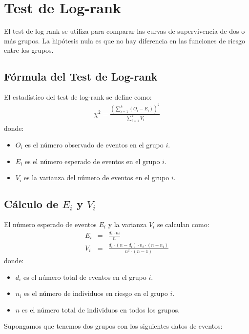 \documentclass[a4paper]{report} %
\begin{document}
\section*{Test de Log-rank}
El test de log-rank se utiliza para comparar las curvas de supervivencia de dos o m\'as grupos. La hip\'otesis nula es que no hay diferencia en las funciones de riesgo entre los grupos.

\subsection*{F\'ormula del Test de Log-rank}
El estad\'istico del test de log-rank se define como:
\begin{eqnarray*}
\chi^2 = \frac{\left(\sum_{i=1}^k (O_i - E_i)\right)^2}{\sum_{i=1}^k V_i}
\end{eqnarray*}
donde:
\begin{itemize}
    \item $O_i$ es el n\'umero observado de eventos en el grupo $i$.
    \item $E_i$ es el n\'umero esperado de eventos en el grupo $i$.
    \item $V_i$ es la varianza del n\'umero de eventos en el grupo $i$.
\end{itemize}

\subsection*{C\'alculo de $E_i$ y $V_i$}
El n\'umero esperado de eventos $E_i$ y la varianza $V_i$ se calculan como:
\begin{eqnarray*}
E_i &=& \frac{d_i \cdot n_i}{n} \\
V_i &=& \frac{d_i \cdot (n - d_i) \cdot n_i \cdot (n - n_i)}{n^2 \cdot (n - 1)}
\end{eqnarray*}
donde:
\begin{itemize}
    \item $d_i$ es el n\'umero total de eventos en el grupo $i$.
    \item $n_i$ es el n\'umero de individuos en riesgo en el grupo $i$.
    \item $n$ es el n\'umero total de individuos en todos los grupos.
\end{itemize}

Supongamos que tenemos dos grupos con los siguientes datos de eventos:
\end{document}

